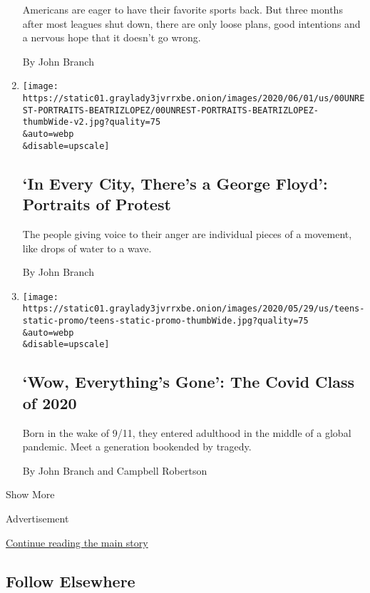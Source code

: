 \begin{enumerate}
  Americans are eager to have their favorite sports back. But three
  months after most leagues shut down, there are only loose plans, good
  intentions and a nervous hope that it doesn't go wrong.

  By John Branch
\item
  \href{/2020/06/02/us/protester-profiles-floyd-minneapolis.html}{}

  \texttt{[image: https://static01.graylady3jvrrxbe.onion/images/2020/06/01/us/00UNREST-PORTRAITS-BEATRIZLOPEZ/00UNREST-PORTRAITS-BEATRIZLOPEZ-thumbWide-v2.jpg?quality=75\\\&auto=webp\\\&disable=upscale]}

  \hypertarget{in-every-city-theres-a-george-floyd-portraits-of-protest}{%
  \subsection{`In Every City, There's a George Floyd': Portraits of
  Protest}\label{in-every-city-theres-a-george-floyd-portraits-of-protest}}

  The people giving voice to their anger are individual pieces of a
  movement, like drops of water to a wave.

  By John Branch
\item
  \href{/interactive/2020/05/30/us/coronavirus-class-of-2020.html}{}

  \texttt{[image: https://static01.graylady3jvrrxbe.onion/images/2020/05/29/us/teens-static-promo/teens-static-promo-thumbWide.jpg?quality=75\\\&auto=webp\\\&disable=upscale]}

  \hypertarget{wow-everythings-gone-the-covid-class-of-2020}{%
  \subsection{`Wow, Everything's Gone': The Covid Class of
  2020}\label{wow-everythings-gone-the-covid-class-of-2020}}

  Born in the wake of 9/11, they entered adulthood in the middle of a
  global pandemic. Meet a generation bookended by tragedy.

  By John Branch and Campbell Robertson
\end{enumerate}

Show More

Advertisement

\protect\hyperlink{after-mid2}{Continue reading the main story}

\hypertarget{follow-elsewhere}{%
\subsection{Follow Elsewhere}\label{follow-elsewhere}}

